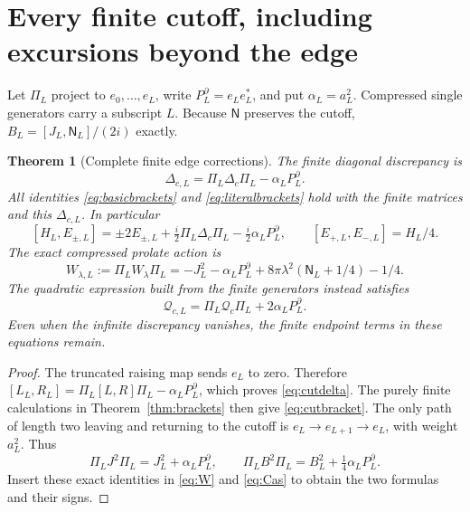 \documentclass[11pt]{article}
\newtheorem{theorem}{Theorem}[section]
\begin{document}
\section{Every finite cutoff, including excursions beyond the edge}

Let $\Pi_L$ project to $e_0,\ldots,e_L$, write
$P_L^\partial=e_Le_L^*$, and put $\alpha_L=a_L^2$.
Compressed single generators carry a subscript $L$.
Because $\mathsf N$ preserves the cutoff,
$B_L=[J_L,\mathsf N_L]/(2i)$ exactly.

\begin{theorem}[Complete finite edge corrections]\label{thm:cutoff}
The finite diagonal discrepancy is
\begin{equation}\label{eq:cutdelta}
 \Delta_{c,L}=\Pi_L\Delta_c\Pi_L-\alpha_LP_L^\partial.
\end{equation}
All identities \eqref{eq:basicbrackets} and
\eqref{eq:literalbrackets} hold with the finite matrices and
this $\Delta_{c,L}$. In particular
\begin{equation}\label{eq:cutbracket}
 [H_L,E_{\pm,L}]
 =\pm2E_{\pm,L}+\tfrac i2\Pi_L\Delta_c\Pi_L
                         -\tfrac i2\alpha_LP_L^\partial,
 \qquad [E_{+,L},E_{-,L}]=H_L/4.
\end{equation}
The exact compressed prolate action is
\begin{equation}\label{eq:cutprolate}
 \boxed{\quad
 W_{\lambda,L}:=\Pi_LW_\lambda\Pi_L
 =-J_L^2-\alpha_LP_L^\partial
        +8\pi\lambda^2(\mathsf N_L+1/4)-1/4.\quad}
\end{equation}
The quadratic expression built from the finite generators
instead satisfies
\begin{equation}\label{eq:cutcas}
 \mathcal Q_{c,L}=\Pi_L\mathcal Q_c\Pi_L
                                   +2\alpha_LP_L^\partial.
\end{equation}
Even when the infinite discrepancy vanishes,
the finite endpoint terms in these equations remain.
\end{theorem}
\begin{proof}
The truncated raising map sends $e_L$ to zero.
Therefore $[L_L,R_L]=\Pi_L[L,R]\Pi_L-\alpha_LP_L^\partial$,
which proves \eqref{eq:cutdelta}. The purely finite
calculations in Theorem~\ref{thm:brackets} then give
\eqref{eq:cutbracket}. The only path of length two
leaving and returning to the cutoff is
$e_L\to e_{L+1}\to e_L$, with weight $a_L^2$.
Thus
\[
 \Pi_LJ^2\Pi_L=J_L^2+\alpha_LP_L^\partial,\qquad
 \Pi_LB^2\Pi_L=B_L^2+\tfrac14\alpha_LP_L^\partial.
\]
Insert these exact identities in \eqref{eq:W} and
\eqref{eq:Cas} to obtain the two formulas and their signs.
\end{proof}
\end{document}
